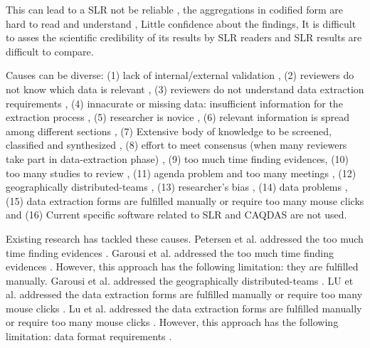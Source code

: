 \documentclass{article}
\begin{document}
This can lead to a SLR not be reliable \cite{Garousi2017} \cite{Wohlin2013}, the aggregations in codified form are hard to read and understand \cite{Dieste2008}, Little confidence about the findings, It is difficult to asses the scientific credibility of its results by SLR  readers and SLR results are difficult to compare. 

Causes can be diverse: (1) lack of internal/external validation \cite{Ampatzoglou2019}, (2) reviewers do not know which data is relevant \cite{Brereton2011}, (3) reviewers do not understand data extraction requirements \cite{Brereton2007} \cite{Zhou2017}, (4) innacurate or missing data: insufficient information for the extraction process \cite{Zhou2017}, (5) researcher is novice \cite{Ribeiro2018} \cite{Carver2013}, (6) relevant information is spread among different sections \cite{Budgen2018} \cite{Budgen2018}, (7) Extensive body of knowledge to be screened, classified and synthesized \cite{link.springer.com}, (8) effort to meet consensus (when many reviewers take part in data-extraction phase) \cite{Ribeiro2018} \cite{Riaz2010} \cite{Brereton2007} \cite{Staples2007} \cite{Bandara2015}, (9) too much time finding evidences, (10) too many studies to review \cite{Garousi2017}, (11) agenda problem and too many meetings \cite{Staples2007} \cite{Staples2007}, (12) geographically distributed-teams \cite{Riaz2010}, (13) researcher's bias \cite{Imtiaz2013} \cite{Ribeiro2018} \cite{Zhou2017} \cite{Zhou2017}, (14) data problems \cite{Bandara2015}, (15) data extraction forms are fulfilled manually or require too many mouse clicks \cite{Staples2007} \cite{Ramezani2017} \cite{Ramezani2017} \cite{Bandara2015} \cite{LU2008} and (16) Current specific software related to SLR and CAQDAS are not used. 
    
Existing research has tackled these causes. Petersen et al. addressed the too much time finding evidences \cite{Petersen2015}. Garousi et al. addressed the too much time finding evidences \cite{Garousi2017}. However, this approach has the following limitation: they are fulfilled manually. Garousi et al. addressed the geographically distributed-teams \cite{Garousi2017}. LU et al. addressed the data extraction forms are fulfilled manually or require too many mouse clicks \cite{LU2008}. Lu et al. addressed the data extraction forms are fulfilled manually or require too many mouse clicks \cite{Lu2008}. However, this approach has the following limitation: data format requirements \cite{Lu2008}. 
    
\end{document}
